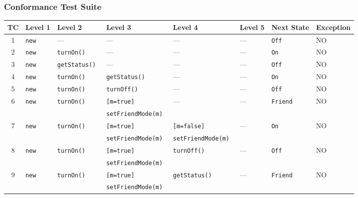 \subsubsection{Conformance Test Suite}
\label{sec:classes.mobile.conformance}
\begin{table}[ht]
  \centering
  \scriptsize
  \begin{tabular}{|c|*{7}{l|}}
    \hline
    \textbf{TC} & \textbf{Level 1} & \textbf{Level 2} & \textbf{Level 3}
      & \textbf{Level 4} & \textbf{Level 5} & \textbf{Next State}
      & \textbf{Exception} \\ \hline
     1 & \tt new & --- & --- & --- & --- & \tt Off & NO \\ \hline
     
     2 & \tt new & \tt turnOn() & --- & --- & --- & \tt On & NO \\ \hline
     3 & \tt new & \tt getStatus() & --- & --- & --- & \tt Off & NO \\ \hline
     
     4 & \tt new & \tt turnOn() & \tt getStatus() & --- & --- & \tt On & NO \\ \hline
     5 & \tt new & \tt turnOn() & \tt turnOff() & --- & --- & \tt Off & NO \\ \hline
     6 & \tt new & \tt turnOn() & \tt [m=true] & --- & --- & \tt Friend & NO \\
       &         &              & \tt setFriendMode(m) &&&& \\ \hline
     
     7 & \tt new & \tt turnOn() & \tt [m=true]         & \tt [m=false] & --- & \tt On & NO \\
       &         &              & \tt setFriendMode(m) & \tt setFriendMode(m) &&& \\ \hline
     8 & \tt new & \tt turnOn() & \tt [m=true] & \tt turnOff() & --- & \tt Off & NO \\
       &         &              & \tt setFriendMode(m) &&&& \\ \hline
     9 & \tt new & \tt turnOn() & \tt [m=true] & \tt getStatus() & --- & \tt Friend & NO \\
       &         &              & \tt setFriendMode(m) &&&& \\ \hline
    

\end{tabular}
\end{table}
